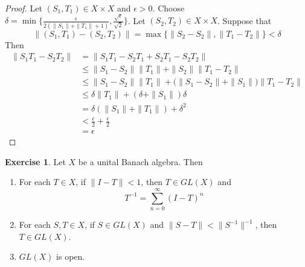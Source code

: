 \documentclass[12pt]{amsart}
\theoremstyle{definition}
\newtheorem{ex}[definition]{Exercise}
\newcommand{\del}{\delta}
\newcommand{\ep}{\epsilon}
\DeclareMathOperator*{\0}{\mbf{0}}
\DeclareMathOperator*{\1}{\mbf{1}}
\newcommand{\lex}[1]{\label{ex:#1}}
\begin{document}
	\begin{proof}
		Let $(S_1,T_1) \in X \times X$ and $\ep > 0$. Choose $\del = \min\{\frac{\ep}{2(\|S_1 \|+ \|T_1 \|+1)}, \frac{\sqrt{\ep}}{\sqrt{2}}\}$. Let $(S_2, T_2) \in X \times X$. Suppose that 
		$$\|(S_1, T_1) - (S_2, T_2) \|= \max \{ \|S_2 -S_2 \|, \|T_1 - T_2 \|\} < \del$$ 
		Then 
		\begin{align*}
			\|S_1T_1 - S_2T_2 \|
			&= \|S_1T_1 - S_2T_1 +S_2T_1 - S_2T_2 \|\\
			& \leq \|S_1 -S_2 \|\|T_1 \|+ \|S_2 \|\|T_1 - T_2 \|\\
			& \leq \|S_1 -S_2 \|\|T_1 \|+ \big( \|S_1-S_2 \|+ \|S_1 \|\big) \|T_1 - T_2 \|\\
			& \leq \del \|T_1 \|+(\del + \|S_1 \|) \del \\
			&= \del (\|S_1 \|+ \|T_1 \|) + \del^2 \\
			& < \frac{\ep}{2} + \frac{\ep}{2}\\
			&= \ep
		\end{align*}
	\end{proof}
	
	
	\begin{ex} \lex{}
		Let $X$ be a unital Banach algebra. Then 
		\begin{enumerate}
			\item For each $T \in X$, if $\|I- T \|< 1$, then $T \in GL(X)$ and $$T^{-1} = \sum_{n=0}^{\infty}(I-T)^n$$
			\item For each $S,T \in X$, if $S \in GL(X)$  and $\|S-T \|< \|S^{-1} \|^{-1}$, then $T \in GL(X)$. 
			\item $GL(X)$ is open.
		\end{enumerate}
	\end{ex}
	
\end{document}
